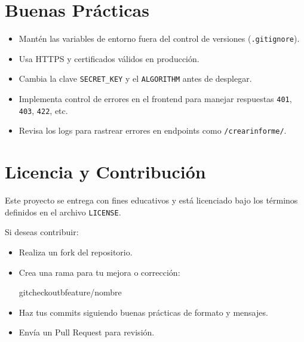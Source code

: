 \documentclass[a4paper,11pt,spanish]{sphinxmanual}
\newcommand{\robotoMonoBold}{\fontseries{b}\selectfont\ttfamily}
\renewcommand{\sphinxcode}[1]{\textcolor{sphinxorangeCode}{{\robotoMonoBold #1}}}
\renewcommand{\sphinxupquote}[1]{\texttt{#1}}
\begin{document}
\section{Buenas Prácticas}
\label{\detokenize{introduccion:buenas-practicas}}\begin{itemize}
\item {} 
\sphinxAtStartPar
Mantén las variables de entorno fuera del control de versiones (\sphinxcode{\sphinxupquote{.gitignore}}).

\item {} 
\sphinxAtStartPar
Usa HTTPS y certificados válidos en producción.

\item {} 
\sphinxAtStartPar
Cambia la clave \sphinxcode{\sphinxupquote{SECRET\_KEY}} y el \sphinxcode{\sphinxupquote{ALGORITHM}} antes de desplegar.

\item {} 
\sphinxAtStartPar
Implementa control de errores en el frontend para manejar respuestas \sphinxcode{\sphinxupquote{401}}, \sphinxcode{\sphinxupquote{403}}, \sphinxcode{\sphinxupquote{422}}, etc.

\item {} 
\sphinxAtStartPar
Revisa los logs para rastrear errores en endpoints como \sphinxcode{\sphinxupquote{/crear\sphinxhyphen{}informe/}}.

\end{itemize}


\section{Licencia y Contribución}
\label{\detokenize{introduccion:licencia-y-contribucion}}
\sphinxAtStartPar
Este proyecto se entrega con fines educativos y está licenciado bajo los términos definidos en el archivo \sphinxcode{\sphinxupquote{LICENSE}}.

\sphinxAtStartPar
Si deseas contribuir:
\begin{itemize}
\item {} 
\sphinxAtStartPar
Realiza un fork del repositorio.

\item {} 
\sphinxAtStartPar
Crea una rama para tu mejora o corrección:

\begin{sphinxVerbatim}[commandchars=\\\{\}]
gitcheckout\PYGZhy{}bfeature/nombre
\end{sphinxVerbatim}

\item {} 
\sphinxAtStartPar
Haz tus commits siguiendo buenas prácticas de formato y mensajes.

\item {} 
\sphinxAtStartPar
Envía un Pull Request para revisión.

\end{itemize}
\end{document}
